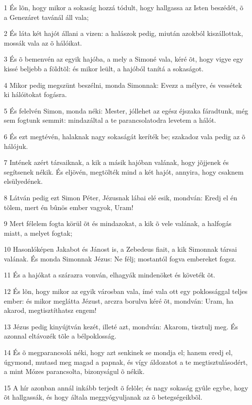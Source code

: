 \par 1 És lõn, hogy mikor a sokaság hozzá tódult, hogy hallgassa az Isten beszédét, õ a Genezáret tavánál áll vala;
\par 2 És láta két hajót állani a vizen: a halászok pedig, miután azokból kiszállottak, mossák vala az õ hálóikat.
\par 3 És õ bemenvén az egyik hajóba, a mely a Simoné vala, kéré õt, hogy vigye egy kissé beljebb a földtõl: és mikor leült, a hajóból tanítá a sokaságot.
\par 4 Mikor pedig megszünt beszélni, monda Simonnak: Evezz a mélyre, és vessétek ki hálóitokat fogásra.
\par 5 És felelvén Simon, monda néki: Mester, jóllehet az egész éjszaka fáradtunk, még sem fogtunk semmit: mindazáltal a te parancsolatodra levetem a hálót.
\par 6 És ezt megtévén, halaknak nagy sokaságát keríték be; szakadoz vala pedig az õ hálójuk.
\par 7 Intének azért társaiknak, a kik a másik hajóban valának, hogy jõjjenek és segítsenek nékik. És eljövén, megtölték mind a két hajót, annyira, hogy csaknem elsülyedének.
\par 8 Látván pedig ezt Simon Péter, Jézusnak lábai elé esik, mondván: Eredj el én tõlem, mert én bûnös ember vagyok, Uram!
\par 9 Mert félelem fogta körül õt és mindazokat, a kik õ vele valának, a halfogás miatt, a melyet fogtak;
\par 10 Hasonlóképen Jakabot és Jánost is, a Zebedeus fiait, a kik Simonnak társai valának. És monda Simonnak Jézus: Ne félj; mostantól fogva embereket fogsz.
\par 11 És a hajókat a szárazra vonván, elhagyák mindenöket és követék õt.
\par 12 És lõn, hogy mikor az egyik városban vala, ímé vala ott egy poklossággal teljes ember: és mikor meglátta Jézust, arczra borulva kéré õt, mondván: Uram, ha akarod, megtisztíthatsz engem!
\par 13 Jézus pedig kinyújtván kezét, illeté azt, mondván: Akarom, tisztulj meg. És azonnal eltávozék tõle a bélpoklosság.
\par 14 És õ megparancsolá néki, hogy azt senkinek se mondja el; hanem eredj el, úgymond, mutasd meg magad a papnak, és vígy áldozatot a te megtisztulásodért, a mint Mózes parancsolta, bizonyságul õ nékik.
\par 15 A hír azonban annál inkább terjedt õ felõle; és nagy sokaság gyûle egybe, hogy õt hallgassák, és hogy általa meggyógyuljanak az õ betegségeikbõl.
